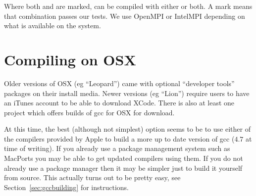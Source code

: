 \noindent Where both \openmp and \mpi are marked, \escript can be compiled with either or both.
A \checkmark mark means that combination passes our tests.
We use OpenMPI or IntelMPI depending on what is available on the system.



\section{Compiling on OSX}
Older versions of OSX (eg ``Leopard'') came with optional ``developer tools'' packages on their install media.
Newer versions (eg ``Lion'') require users to have an iTunes account to be able to download XCode.
There is also at least one project which offers builds of gcc for OSX for download.

At this time,  the best (although not simplest) option seems to be to use either of the compilers 
provided by Apple to build a more up to date version of gcc ($4.7$ at time of writing).
If you already use a package management system such as MacPorts you may be able to get updated compilers using them.
If you do not already use a package manager then it may be simpler just to build it yourself from source.
This actually turns out to be pretty easy, see Section~\ref{sec:gccbuilding} for instructions.





